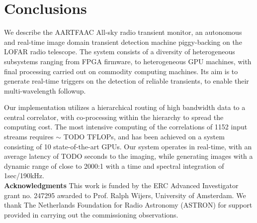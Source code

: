 \documentclass{ws-jai}
\begin{document}
\section {\label{sec:conclusion} Conclusions}
We  describe the  AARTFAAC All-sky  radio transient  monitor, an  autonomous and
real-time image  domain transient detection  machine piggy-backing on  the LOFAR
radio telescope. The  system consists of a diversity  of heterogeneous subsystems
ranging  from  FPGA  firmware,  to   heterogeneous  GPU  machines,  with  final
processing carried out on commodity computing  machines.  Its aim is to generate
real-time  triggers on  the detection  of reliable  transients, to  enable their
multi-wavelength followup.

Our implementation utilizes  a hierarchical routing of high bandwidth  data to a
central  correlator,  with co-processing  within  the  hierarchy to  spread  the
computing cost.  The most intensive computing  of the correlations of 1152 input
streams requires $\sim$  TODO TFLOPs, and has been achieved on  a system consisting
of 10 state-of-the-art GPUs.  Our system  operates in real-time, with an average
latency of TODO  seconds to the imaging, while generating  images with a dynamic
range of close to 2000:1 with a time and spectral integration of 1sec/190kHz.\\


\noindent  \textbf{Acknowledgments} This  work  is funded  by  the ERC  Advanced
Investigator  grant no.  247295 awarded  to Prof.   Ralph Wijers,  University of
Amsterdam.  We thank The Netherlands Foundation for Radio Astronomy (ASTRON) for
support provided in carrying out the commissioning observations.



\end{document}
